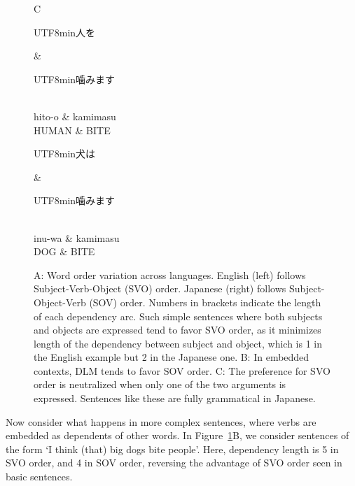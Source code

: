 \documentclass[11pt,a4paper]{article}
\newcommand{\japanese}[1]{\begin{CJK}{UTF8}{min}#1\end{CJK}}
\begin{document}
\begin{figure}
C
\begin{dependency}[theme = simple]
   \begin{deptext}[column sep=1em]
   \japanese{人を} \& \japanese{噛みます}\\ 
   hito-o \& kamimasu \\
   HUMAN \& BITE  \\
   \end{deptext}
\end{dependency}
\begin{dependency}[theme = simple]
   \begin{deptext}[column sep=1em]
   \japanese{犬は} \& \japanese{噛みます}\\ 
   inu-wa \& kamimasu \\
          DOG \& BITE  \\
   \end{deptext}
\end{dependency}

	\caption{A: Word order variation across languages. English (left) follows Subject-Verb-Object (SVO) order. Japanese (right) follows Subject-Object-Verb (SOV) order. Numbers in brackets indicate the length of each dependency arc. Such simple sentences where both subjects and objects are expressed tend to favor SVO order, as it minimizes length of the dependency between subject and object, which is 1 in the English example but 2 in the Japanese one. B: In embedded contexts, DLM tends to favor SOV order. C: The preference for SVO order is neutralized when only one of the two arguments is expressed. Sentences like these are fully grammatical in Japanese.}
        \label{fig:sent-dep}
\end{figure}

Now consider what happens in more complex sentences, where verbs are embedded as dependents of other words.
In Figure~\ref{fig:sent-dep}B, we consider sentences of the form `I think (that) big dogs bite people'.
Here, dependency length is 5 in SVO order, and 4 in SOV order, reversing the advantage  of SVO order seen in basic sentences.
\end{document}
